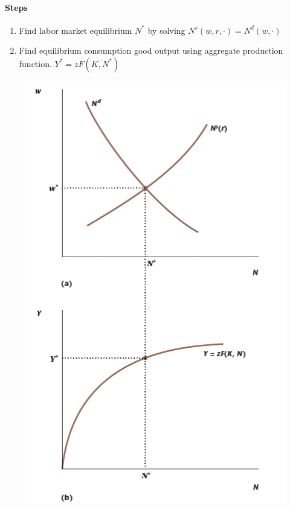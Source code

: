 \documentclass[11pt]{article}
\begin{document}
					\paragraph{Steps}
						\begin{enumerate}
							\item Find labor market equilibrium $N^*$ by solving $N^s(w, r, \cdot) = N^d(w, \cdot)$
							\item Find equilibrium consumption good output using aggregate production function. $Y^* = zF(K, N^*)$
						\end{enumerate}
					\begin{figure}[h]
						\begin{minipage}{0.5\linewidth}
						\centering
						\includegraphics[width=\linewidth]{figures/1112}

\end{minipage}
\end{figure}
\end{document}
